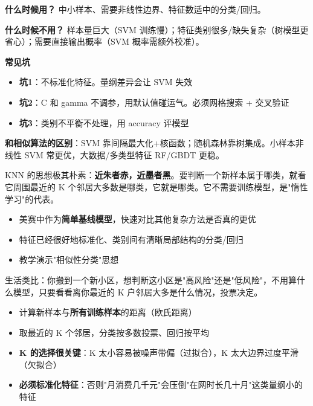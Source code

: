 \begin{algonotes}
\textbf{什么时候用？} 中小样本、需要非线性边界、特征数适中的分类/回归。

\textbf{什么时候不用？} 样本量巨大（SVM 训练慢）；特征类别很多/缺失复杂（树模型更省心）；需要直接输出概率（SVM 概率需额外校准）。

\textbf{常见坑}
\begin{itemize}
    \item \textbf{坑1}：不标准化特征。量纲差异会让 SVM 失效
    \item \textbf{坑2}：C 和 gamma 不调参，用默认值碰运气。必须网格搜索 + 交叉验证
    \item \textbf{坑3}：类别不平衡不处理，用 accuracy 评模型
\end{itemize}

\textbf{和相似算法的区别}：SVM 靠间隔最大化+核函数；随机森林靠树集成。小样本非线性 SVM 常更优，大数据/多类型特征 RF/GBDT 更稳。
\end{algonotes}


\begin{algointro}
KNN 的思想极其朴素：\textbf{近朱者赤，近墨者黑}。要判断一个新样本属于哪类，就看它周围最近的 K 个邻居大多数是哪类，它就是哪类。它不需要训练模型，是"惰性学习"的代表。
\end{algointro}

\begin{algoscene}
\begin{itemize}
    \item 美赛中作为\textbf{简单基线模型}，快速对比其他复杂方法是否真的更优
    \item 特征已经很好地标准化、类别间有清晰局部结构的分类/回归
    \item 教学演示"相似性分类"思想
\end{itemize}
\end{algoscene}

\begin{algoprinciple}
生活类比：你搬到一个新小区，想判断这小区是"高风险"还是"低风险"，不用算什么模型，只要看看离你最近的 K 户邻居大多是什么情况，投票决定。

\begin{itemize}
    \item 计算新样本与\textbf{所有训练样本}的距离（欧氏距离）
    \item 取最近的 K 个邻居，分类按多数投票、回归按平均
    \item \textbf{K 的选择很关键}：K 太小容易被噪声带偏（过拟合），K 太大边界过度平滑（欠拟合）
    \item \textbf{必须标准化特征}：否则"月消费几千元"会压倒"在网时长几十月"这类量纲小的特征
\end{itemize}
\end{algoprinciple}

